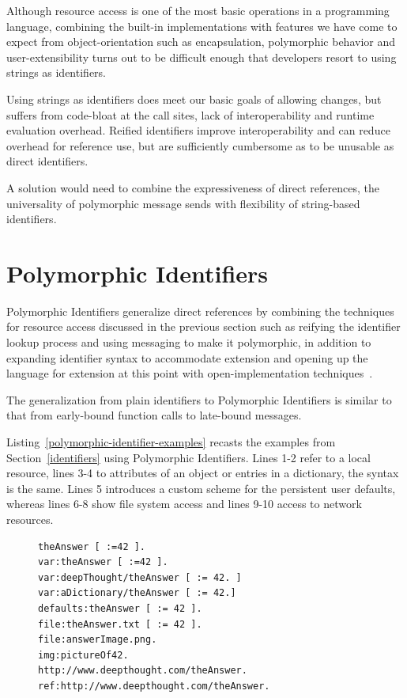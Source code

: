 \documentclass{acm_proc_article-sp}
\begin{document}
Although resource access is one of the most basic operations in a programming language, combining 
the built-in implementations 
with features we have come to expect from object-orientation such as encapsulation, polymorphic
behavior and user-extensibility turns out to be difficult enough that developers resort to using
strings as identifiers.

Using strings as identifiers does meet our basic goals of allowing changes, but suffers from
code-bloat at the call sites, lack of interoperability and runtime evaluation overhead.  Reified 
identifiers improve interoperability and can reduce overhead for reference use, but are 
sufficiently cumbersome as to be unusable as direct identifiers.

A solution would need to combine the expressiveness of direct references, the universality
of polymorphic message sends with flexibility of string-based identifiers.



\section{Polymorphic Identifiers}
\label{polymorphic-identifiers}

Polymorphic Identifiers generalize direct references by combining the techniques for resource access
discussed in the previous section such as reifying the identifier lookup process and using messaging 
to make it polymorphic, in addition to expanding identifier syntax to accommodate extension and 
opening up the language for extension at this point  with open-implementation techniques~\cite{OpenImplementations}.

The generalization from plain identifiers to Polymorphic Identifiers is similar to that from early-bound
function calls to late-bound messages.

Listing~\ref{polymorphic-identifier-examples} recasts the examples from Section~\ref{identifiers} using
Polymorphic Identifiers.  Lines 1-2 refer to a local resource, lines 3-4 to attributes of an object or 
entries in a dictionary, the syntax is the same.  Lines 5 introduces a custom scheme for the persistent
user defaults, whereas lines 6-8 show file system access and lines 9-10 access to network resources.



\begin{figure}[htbp]
\begin{lstlisting}[style=numbers,label=polymorphic-identifier-examples,caption=Retrieve \mbox{[and store]} values via Polymorphic Identifiers.]
theAnswer [ :=42 ].
var:theAnswer [ :=42 ].
var:deepThought/theAnswer [ := 42. ]
var:aDictionary/theAnswer [ := 42.]
defaults:theAnswer [ := 42 ].
file:theAnswer.txt [ := 42 ].
file:answerImage.png.
img:pictureOf42.
http://www.deepthought.com/theAnswer.
ref:http://www.deepthought.com/theAnswer.
\end{lstlisting}
\end{figure}
\end{document}
